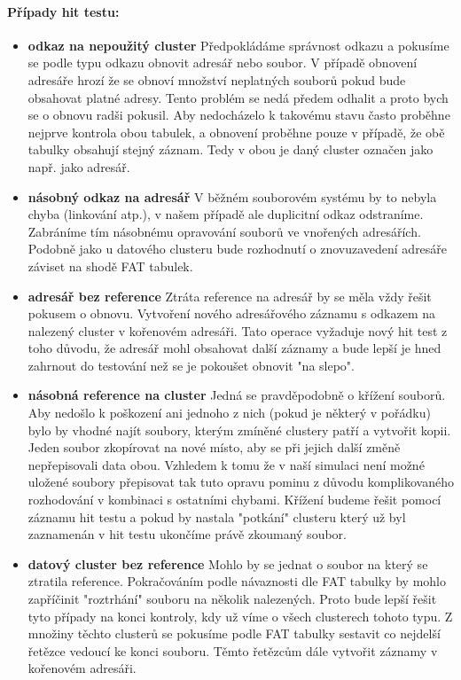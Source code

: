 \documentclass[12pt]{article}
\begin{document}
\paragraph{Případy hit testu:}
\begin{itemize}

\item \textbf{odkaz na nepoužitý cluster} Předpokládáme správnost odkazu a pokusíme se podle typu odkazu obnovit adresář nebo soubor. V případě obnovení adresáře hrozí že se obnoví množství neplatných souborů pokud bude obsahovat platné adresy. Tento problém se nedá předem odhalit a proto bych se o obnovu radši pokusil. Aby nedocházelo k takovému stavu často proběhne nejprve kontrola obou tabulek, a obnovení proběhne pouze v případě, že obě tabulky obsahují stejný záznam. Tedy v obou je daný cluster označen jako např. jako adresář.

\item \textbf{násobný odkaz na adresář} V běžném souborovém systému by to nebyla chyba (linkování atp.), v našem případě ale duplicitní odkaz odstraníme. Zabráníme tím násobnému opravování souborů ve vnořených adresářích. Podobně jako u datového clusteru bude rozhodnutí o znovuzavedení adresáře záviset na shodě FAT tabulek.

\item \textbf{adresář bez reference} Ztráta reference na adresář by se měla vždy řešit pokusem o obnovu. Vytvoření nového adresářového záznamu s odkazem na nalezený cluster v kořenovém adresáři. Tato operace vyžaduje nový hit test z toho důvodu, že adresář mohl obsahovat další záznamy a bude lepší je hned zahrnout do testování než se je pokoušet obnovit "na slepo".

\pagebreak

\item \textbf{násobná reference na cluster} Jedná se pravděpodobně o křížení souborů. Aby nedošlo k poškození ani jednoho z nich (pokud je některý v pořádku) bylo by vhodné najít soubory, kterým zmíněné clustery patří a vytvořit kopii. Jeden soubor zkopírovat na nové místo, aby se při jejich další změně nepřepisovali data obou. Vzhledem k tomu že v naší simulaci není možné uložené soubory přepisovat tak tuto opravu pominu z důvodu komplikovaného rozhodování v kombinaci s ostatními chybami. Křížení budeme řešit pomocí záznamu hit testu a pokud by nastala "potkání" clusteru který už byl zaznamenán v hit testu ukončíme právě zkoumaný soubor.

\item \textbf{datový cluster bez reference} Mohlo by se jednat o soubor na který se ztratila reference. Pokračováním podle návaznosti dle FAT tabulky by mohlo zapříčinit "roztrhání" souboru na několik nalezených. Proto bude lepší řešit tyto případy na konci kontroly, kdy už víme o všech clusterech tohoto typu. Z množiny těchto clusterů se pokusíme podle FAT tabulky sestavit co nejdelší řetězce vedoucí ke konci souboru. Těmto řetězcům dále vytvořit záznamy v kořenovém adresáři.
\end{itemize}
\end{document}
